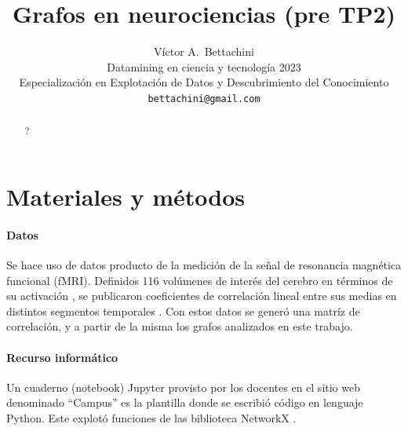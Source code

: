 \documentclass{article}
\title{Grafos en neurociencias (pre TP2)}
\author{
  Víctor A.~Bettachini\\ %
  Datamining en ciencia y tecnología 2023\\
  Especialización en Explotación de Datos y Descubrimiento del Conocimiento\\
  \texttt{bettachini@gmail.com}
}
\begin{document}
\maketitle


\begin{abstract}
?
\end{abstract}





\section{Materiales y métodos}

\paragraph{Datos}
Se hace uso de datos producto de la medición de la señal de resonancia magnética funcional (fMRI).
Definidos 116 volúmenes de interés del cerebro en términos de su activación \cite{tzourio-mazoyer_automated_2002}, se publicaron coeficientes de correlación lineal entre sus medias en distintos segmentos temporales \cite{tagliazucchi_large-scale_2013}.
Con estos datos se generó una matríz de correlación, y a partir de la misma los grafos analizados en este trabajo.


\paragraph{Recurso informático} 
Un cuaderno (notebook) Jupyter provisto por los docentes en el sitio web denominado ``Campus'' \cite{kamienkowski_curso_2023} es la plantilla donde se escribió código en lenguaje Python.
Este explotó funciones de las biblioteca NetworkX \cite{hagberg_exploring_2008}.
\end{document}
